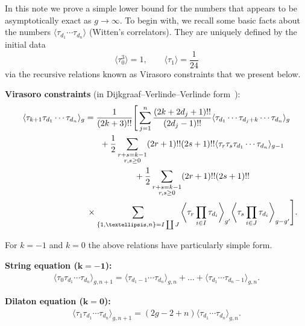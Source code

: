 \documentclass[11pt]{article}
\theoremstyle{definition}
\begin{document}
\setcounter{section}{1}
\setcounter{subsection}{0}
\setcounter{subsubsection}{0}
\setcounter{Theorem}{0}
\setcounter{equation}{0}
In this note we prove a simple lower bound for the numbers
that appears to be asymptotically exact as $g\to\infty$. To
begin with, we recall some basic facts about the numbers
$\langle\tau_{d_1}\cdots\tau_{d_n}\rangle$ (Witten's
correlators). They are uniquely defined by the initial data
\[
\big\langle \tau_0^3 \big\rangle = 1,\qquad
\langle \tau_{1} \rangle = \frac{1}{24}
\]
via the recursive relations known as Virasoro constraints that we present below.

\textbf{Virasoro constraints} (in Dijkgraaf--Verlinde--Verlinde form~\cite{Dij, DVV}):
\begin{gather}
\langle\tau_{k+1}\tau_{d_1}\cdots\tau_{d_n}\rangle_g=\frac{1}{(2k+3)!!}\Bigg[\sum_{j=1}^n
\frac{(2k+2d_j+1)!!}{(2d_j-1)!!}\langle\tau_{d_1}\cdots
\tau_{d_{j}+k}\cdots\tau_{d_n}\rangle_g\nonumber\\
\hphantom{\langle\tau_{k+1}\tau_{d_1}\cdots\tau_{d_n}\rangle_g=}{} +\frac{1}{2}\sum_{\substack{r+s=k-1\\r,s\ge 0}}
(2r+1)!!(2s+1)!!\langle\tau_r\tau_s\tau_{d_1}\cdots\tau_{d_n}\rangle_{g-1}\nonumber\\
\hphantom{\langle\tau_{k+1}\tau_{d_1}\cdots\tau_{d_n}\rangle_g=}{} +\frac{1}{2}\sum_{\substack{r+s=k-1\\r,s\ge 0}} (2r+1)!!(2s+1)!!\nonumber\\
\hphantom{\langle\tau_{k+1}\tau_{d_1}\cdots\tau_{d_n}\rangle_g=}{}\times
\sum_{\{1,\dots,n\}=I\coprod J}\bigg\langle\tau_r\prod_{i\in
I}\tau_{d_i}\bigg\rangle_{g'}\bigg\langle\tau_s\prod_{i\in
J}\tau_{d_i}\bigg\rangle_{g-g'}\Bigg].\label{eq:virasoro}
\end{gather}

For $k=-1$ and $k=0$ the above relations have particularly simple form.

\textbf{String equation ($\boldsymbol{k=-1}$):}
\begin{gather}\label{eq:string}
\langle \tau_0\tau_{d_1} \cdots \tau_{d_n}\rangle_{g,n+1}
=\langle \tau_{d_1-1} \cdots \tau_{d_n}\rangle_{g,n}
+\dots
+\langle \tau_{d_1} \cdots \tau_{d_n-1}\rangle_{g,n} .
\end{gather}

\textbf{Dilaton equation ($\boldsymbol{k=0}$):}
\begin{gather*}%
\langle \tau_1\tau_{d_1} \cdots \tau_{d_n}\rangle_{g,n+1}
=(2g-2+n)\langle \tau_{d_1} \cdots \tau_{d_n}\rangle_{g,n} .
\end{gather*}
\end{document}
